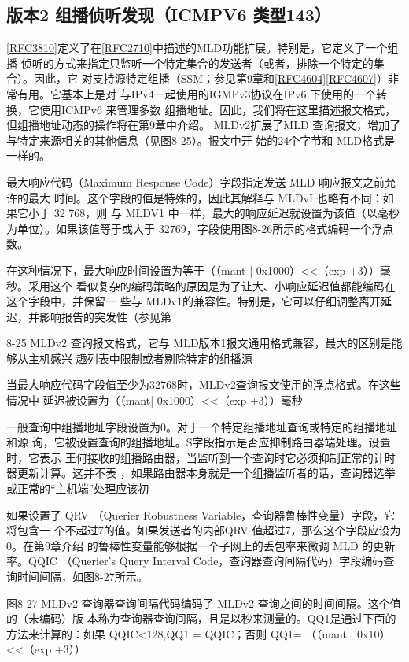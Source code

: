 \subsection{版本2 组播侦听发现（ICMPV6 类型143）}
\href{https://www.rfc-editor.org/rfc/rfc3810}{[RFC3810]}定义了在\href{https://www.rfc-editor.org/rfc/rfc2710}{[RFC2710]}中描述的MLD功能扩展。特别是，它定义了一个组播
侦听的方式来指定只监听一个特定集合的发送者（或者，排除一个特定的集合）。因此，它
对支持源特定组播（SSM；参见第9章和\href{https://www.rfc-editor.org/rfc/rfc4604}{[RFC4604]}\href{https://www.rfc-editor.org/rfc/rfc4607}{[RFC4607]}）非常有用。它基本上是对
与IPv4一起使用的IGMPv3协议在IPv6 下使用的一个转换，它使用ICMPv6 来管理多数
组播地址。因此，我们将在这里描述报文格式，但组播地址动态的操作将在第9章中介绍。
MLDv2扩展了MLD 查询报文，增加了与特定来源相关的其他信息（见图8-25）。报文中开
始的24个字节和 MLD格式是一样的。

最大响应代码（Maximum Response Code）字段指定发送 MLD 响应报文之前允许的最大
时间。这个字段的值是特殊的，因此其解释与 MLDvI 也略有不同：如果它小于 32 768，则
与 MLDV1 中一样，最大的响应延迟就设置为该值（以毫秒为单位）。如果该值等于或大于
32769，字段使用图8-26所示的格式编码一个浮点数。

在这种情况下，最大响应时间设置为等于（（mant | 0x1000）<<（exp +3））毫秒。采用这个
看似复杂的编码策略的原因是为了让大、小响应延迟值都能编码在这个字段中，并保留一
些与 MLDv1的兼容性。特别是，它可以仔细调整离开延迟，并影响报告的突发性（参见第

8-25 MLDv2 查询报文格式，它与 MLD版本1报文通用格式兼容，最大的区别是能够从主机感兴
趣列表中限制或者剔除特定的组播源

当最大响应代码字段值至少为32768时，MLDv2查询报文使用的浮点格式。在这些情况中
延迟被设置为（（mant| 0x1000）<<（exp +3））毫秒

一般查询中组播地址字段设置为0。对于一个特定组播地址查询或特定的组播地址和源
询，它被设置查询的组播地址。S字段指示是否应抑制路由器端处理。设置时，它表示
王何接收的组播路由器，当监听到一个查询时它必须抑制正常的计时器更新计算。这并不表
，如果路由器本身就是一个组播监听者的话，查询器选举或正常的“主机端”处理应该初

如果设置了 QRV （Querier Robustness Variable，查询器鲁棒性变量）字段，它将包含一
个不超过7的值。如果发送者的内部QRV 值超过7，那么这个字段应设为0。在第9章介绍
的鲁棒性变量能够根据一个子网上的丢包率来微调 MLD 的更新率。QQIC （Querier’s Query
Interval Code，查询器查询间隔代码）字段编码查询时间间隔，如图8-27所示。


图8-27 MLDv2 查询器查询间隔代码编码了 MLDv2 查询之间的时间间隔。这个值的（未编码）版
本称为查询器查询间隔，且是以秒来测量的。QQ1是通过下面的方法来计算的：如果
QQIC<128,QQ1 = QQIC；否则 QQ1= （（mant | 0x10）<<（exp +3））

